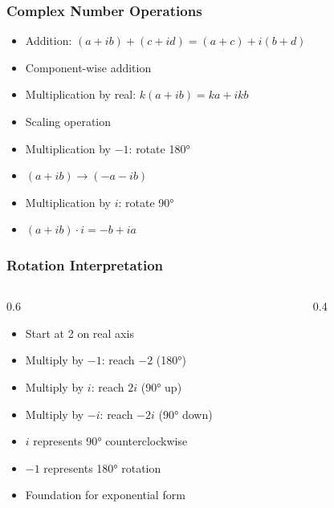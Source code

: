 \begin{frame}[fragile]\frametitle{Complex Number Operations}
  \begin{itemize}
    \item Addition: $(a+ib) + (c+id) = (a+c) + i(b+d)$
    \item Component-wise addition
    \item Multiplication by real: $k(a+ib) = ka + ikb$
    \item Scaling operation
    \item Multiplication by $-1$: rotate 180°
    \item $(a+ib) \to (-a-ib)$
    \item Multiplication by $i$: rotate 90°
    \item $(a+ib) \cdot i = -b + ia$
  \end{itemize}
\end{frame}

\begin{frame}[fragile]\frametitle{Rotation Interpretation}
  \begin{columns}
    \begin{column}[T]{0.6\linewidth}
      \begin{itemize}
        \item Start at 2 on real axis
        \item Multiply by $-1$: reach $-2$ (180°)
        \item Multiply by $i$: reach $2i$ (90° up)
        \item Multiply by $-i$: reach $-2i$ (90° down)
        \item $i$ represents 90° counterclockwise
        \item $-1$ represents 180° rotation
        \item Foundation for exponential form
      \end{itemize}
    \end{column}
    \begin{column}[T]{0.4\linewidth}
      \begin{center}
      \end{center}
    \end{column}
  \end{columns}
\end{frame}

